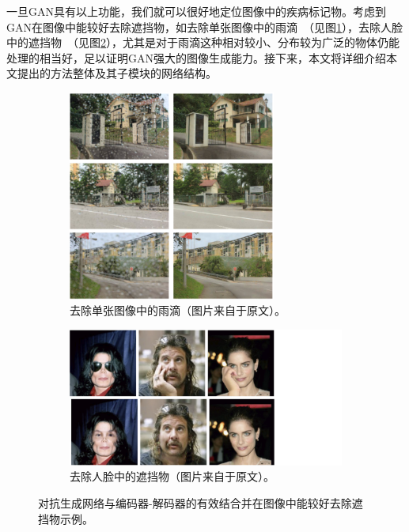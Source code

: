 \noindent 一旦GAN具有以上功能，我们就可以很好地定位图像中的疾病标记物。考虑到GAN在图像中能较好去除遮挡物，如去除单张图像中的雨滴~\cite{qian2018attentive}（见图\ref{subfig:attention_gan}），去除人脸中的遮挡物~\cite{yuan2019face}（见图\ref{subfig:face_de_occulusion}），尤其是对于雨滴这种相对较小、分布较为广泛的物体仍能处理的相当好，足以证明GAN强大的图像生成能力。接下来，本文将详细介绍本文提出的方法整体及其子模块的网络结构。
\begin{figure}[h!]
	\begin{subfigure}{0.45\textwidth}
		\centering
		\includegraphics[width=0.75\textwidth]{figure/attention_gan_example.png}
		\caption{去除单张图像中的雨滴（图片来自于原文）。}
		\label{subfig:attention_gan}
	\end{subfigure}
	\begin{subfigure}{0.45\textwidth}
		\centering
		\includegraphics[width=1.5\textwidth]{figure/face_de_occulusion.png}
		\caption{去除人脸中的遮挡物（图片来自于原文）。}
		\label{subfig:face_de_occulusion}
	\end{subfigure}
	\caption{对抗生成网络与编码器-解码器的有效结合并在图像中能较好去除遮挡物示例。}
	\label{mul_fig:gan_auto_encoder_example}
\end{figure}


